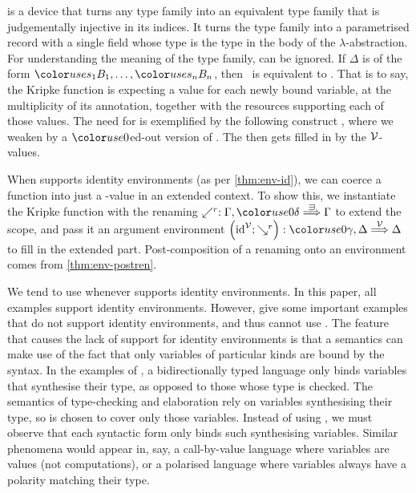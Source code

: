  is a device that turns any type family into an equivalent
type family that is judgementally injective in its indices.
It turns the type family into a parametrised record with a single field
 whose type is the type in the body of the $\lambda$-abstraction.
For understanding the meaning of the type family,  can be
ignored.
If $\Delta$ is of the form $\gr{s_1}B_1, \ldots, \gr{s_n}B_n$, then
\ is equivalent to
.
That is to say, the Kripke function is expecting a value for each newly bound
variable, at the multiplicity of its annotation, together with the resources
supporting each of those values.
The need for  is exemplified by the following construct
, where we weaken \AgdaBound{$\Gamma$} by a $\gr0$ed-out
version of \AgdaBound{$\Delta$}.
The \AgdaBound{$\Delta$} then gets filled in by the $\V$-values.

When \AgdaBound{$\V$} supports identity environments (as per \cref{thm:env-id}),
we can coerce a  function into just a
\AgdaBound{$\C$}-value in an extended context.
To show this, we instantiate the Kripke function with the renaming
$\swarrow^r : \Gamma, \gr0\delta \env\sqni \Gamma$ to extend the scope, and
pass it an argument environment
$\plr{\id^\V; \searrow^r} : \gr0\gamma, \Delta \env\V \Delta$ to fill in the
extended part.
Post-composition of a renaming onto an environment comes from
\cref{thm:env-postren}.


We tend to use  whenever \AgdaBound{$\V$} supports
identity environments.
In this paper, all examples support identity environments.
However, \citet[p.~27]{AACMM20} give some important examples that do not
support identity environments, and thus cannot use .
The feature that causes the lack of support for identity environments is that
a semantics can make use of the fact that only variables of particular kinds
are bound by the syntax.
In the examples of \citeauthor{AACMM20}, a bidirectionally typed language only
binds variables that synthesise their type, as opposed to those whose type is
checked.
The semantics of type-checking and elaboration rely on variables synthesising
their type, so \AgdaBound{$\V$} is chosen to cover only those variables.
Instead of using , we must observe that each syntactic form
only binds such synthesising variables.
Similar phenomena would appear in, say, a call-by-value language where
variables are values (not computations), or a polarised language where
variables always have a polarity matching their type.

